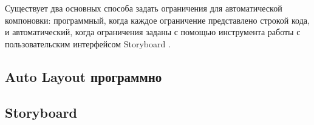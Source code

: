 Существует два основных способа задать ограничения для автоматической компоновки: программный, когда каждое ограничение представлено строкой кода, и автоматический, когда ограничения заданы с помощью инструмента работы с пользовательским интерфейсом Storyboard \cite{storyboard}.

\subsection{Auto Layout программно}


\subsection{Storyboard}

